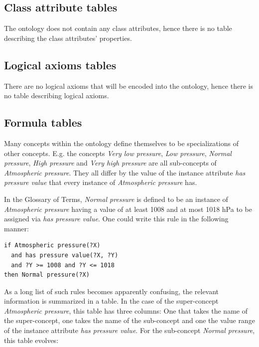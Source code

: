\subsection{Class attribute tables}

The ontology does not contain any class attributes, hence there is no table describing the class attributes' properties.

\subsection{Logical axioms tables} %

There are no logical axioms that will be encoded into the ontology, hence there is no table describing logical axioms.


\subsection{Formula tables} %

Many concepts within the \thinkhomeweather ontology define themselves to be specializations of other concepts. E.g. the concepts \emph{Very low pressure}, \emph{Low pressure}, \emph{Normal pressure}, \emph{High pressure} and \emph{Very high pressure} are all sub-concepts of \emph{Atmospheric pressure}. They all differ by the value of the instance attribute \emph{has pressure value} that every instance of \emph{Atmospheric pressure} has.

In the Glossary of Terms, \emph{Normal pressure} is defined to be an instance of \emph{Atmospheric pressure} having a value of at least 1008 and at most 1018 hPa to be assigned via \emph{has pressure value}. One could write this rule in the following manner:

\begin{verbatim}
if Atmospheric pressure(?X)
  and has pressure value(?X, ?Y)
  and ?Y >= 1008 and ?Y <= 1018
then Normal pressure(?X)
\end{verbatim}

As a long list of such rules becomes apparently confusing, the relevant information is summarized in a table. In the case of the super-concept \emph{Atmospheric pressure}, this table has three columns: One that takes the name of the super-concept, one takes the name of the sub-concept and one the value range of the instance attribute \emph{has pressure value}. For the sub-concept \emph{Normal pressure}, this table evolves:

